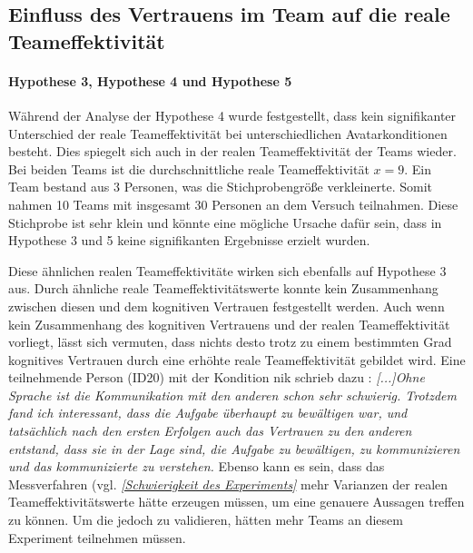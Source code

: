 \documentclass[a4paper,11pt]{article}%
\renewcommand{\\}{\vspace*{0.5\baselineskip} \newline}
\begin{document}
\subsection{Einfluss des Vertrauens im Team auf die reale Teameffektivität}
\paragraph{Hypothese 3, Hypothese 4 und Hypothese 5}
Während der Analyse der Hypothese 4 wurde festgestellt, dass kein signifikanter Unterschied der reale Teameffektivität bei unterschiedlichen Avatarkonditionen besteht. Dies spiegelt sich auch in der realen Teameffektivität der Teams wieder. Bei beiden Teams ist die durchschnittliche reale Teameffektivität $x=9$.  
Ein Team bestand aus 3 Personen, was die Stichprobengröße verkleinerte. Somit nahmen 10 Teams mit insgesamt 30 Personen an dem Versuch teilnahmen. Diese Stichprobe ist sehr klein und könnte eine mögliche Ursache dafür sein, dass in Hypothese 3 und 5 keine signifikanten Ergebnisse erzielt wurden.

Diese ähnlichen realen Teameffektivitäte wirken sich ebenfalls auf Hypothese 3 aus. Durch ähnliche reale Teameffektivitätswerte konnte kein Zusammenhang zwischen diesen und dem kognitiven Vertrauen festgestellt werden. 
Auch wenn kein Zusammenhang des kognitiven Vertrauens und der realen Teameffektivität vorliegt, lässt sich vermuten, dass nichts desto trotz zu einem bestimmten Grad kognitives Vertrauen durch eine erhöhte reale Teameffektivität gebildet wird.
Eine teilnehmende Person (ID20) mit der Kondition \ac{nik} schrieb dazu : \newline
\dq{}\textit{[...]Ohne Sprache ist die Kommunikation mit den anderen schon sehr schwierig. Trotzdem fand ich interessant, dass die Aufgabe überhaupt zu bewältigen war, und tatsächlich nach den ersten Erfolgen auch das Vertrauen zu den anderen entstand, dass sie in der Lage sind, die Aufgabe zu bewältigen, zu kommunizieren und das kommunizierte zu verstehen.}\dq{}
Ebenso kann es sein, dass das Messverfahren (vgl. \textit{\ref{Schwierigkeit des Experiments}} mehr Varianzen der realen Teameffektivitätswerte hätte erzeugen müssen, um eine genauere Aussagen treffen zu können.
Um die jedoch zu validieren, hätten mehr Teams an diesem Experiment teilnehmen müssen.
	
\end{document}
